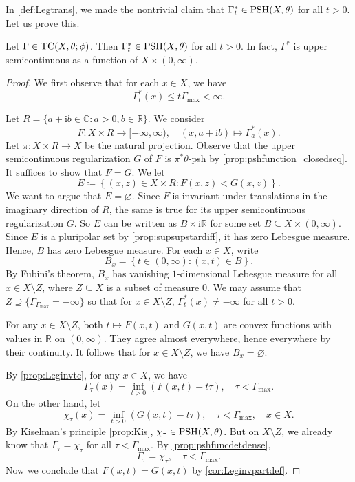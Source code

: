 In \cref{def:Legtrans}, we made the nontrivial claim that $\Gamma^*_t\in \mathrm{PSH}(X,\theta)$ for all $t>0$. Let us prove this.
\begin{lemma}\label{lma:testcurvelegusc}
    Let $\Gamma\in \mathrm{TC}(X,\theta;\phi)$. Then $\Gamma^*_t\in \mathrm{PSH}(X,\theta)$ for all $t>0$. In fact, $\Gamma^*$ is upper semicontinuous as a function of $X\times (0,\infty)$.
\end{lemma}
\begin{proof}
    We first observe that for each $x\in X$, we have
    \[
        \Gamma_t^*(x)\leq t\Gamma_{\max}<\infty.
    \]

    Let $R=\{a+\mathrm{i}b\in \mathbb{C}:a>0,b\in \mathbb{R}\}$. We consider
    \[
        F\colon X\times R\rightarrow [-\infty,\infty),\quad (x,a+\mathrm{i}b)\mapsto \Gamma_a^*(x).
    \]
    Let $\pi\colon X\times R\rightarrow X$ be the natural projection.
    Observe that the upper semicontinuous regularization $G$ of $F$ is $\pi^*\theta$-psh by \cref{prop:pshfunction_closedseq}.
    It suffices to show that $F=G$.
    We let
    \[
        E\coloneqq \left\{ (x,z)\in X\times R: F(x,z)<G(x,z)  \right\}.
    \]
    We want to argue that $E=\varnothing$. Since $F$ is invariant under translations in the imaginary direction of $R$, the same is true for its upper semicontinuous regularization $G$. So $E$ can be written as $B\times \mathrm{i}\mathbb{R}$ for some set $B\subseteq X\times (0,\infty)$. Since $E$ is a pluripolar set by \cref{prop:supsupstardiff}, it has zero Lebesgue measure. Hence, $B$ has zero Lebesgue measure. For each $x\in X$, write
    \[
        B_x=\left\{t\in (0,\infty): (x,t)\in B \right\}.
    \]
    By Fubini's theorem, $B_x$ has vanishing $1$-dimensional Lebesgue measure for all $x\in X\setminus Z$, where $Z\subseteq X$ is a subset of measure $0$. We may assume that $Z\supseteq \{\Gamma_{\Gamma_{\max}}=-\infty\}$ so that for $x\in X\setminus Z$, $\Gamma^*_t(x)\neq -\infty$ for all $t>0$.

    For any $x\in X\setminus Z$, both $t\mapsto F(x,t)$ and $G(x,t)$ are convex functions with values in $\mathbb{R}$ on $(0,\infty)$. They agree almost everywhere, hence everywhere by their continuity. It follows that for $x\in X\setminus Z$, we have $B_x=\varnothing$.

    By \cref{prop:Leginvtc}, for any $x\in X$, we have
    \[
        \Gamma_{\tau}(x)=\inf_{t>0} (F(x,t)-t\tau),\quad \tau<\Gamma_{\max}.
    \]
    On the other hand, let
    \begin{equation}\label{eq:chiGlegtemp1}
        \chi_{\tau}(x)=\inf_{t>0} (G(x,t)-t\tau),\quad \tau<  \Gamma_{\max},\quad x\in X.
    \end{equation}
    By Kiselman's principle \cref{prop:Kis}, $\chi_{\tau}\in \mathrm{PSH}(X,\theta)$. But on $X\setminus Z$, we already know that $\Gamma_{\tau}=\chi_{\tau}$ for all $\tau<\Gamma_{\max}$. By \cref{prop:pshfuncdetdense},
    \[
    \Gamma_{\tau}=\chi_{\tau},\quad \tau<\Gamma_{\max}.
    \]
    Now we conclude that $F(x,t)=G(x,t)$ by \cref{cor:Leginvpartdef}.
\end{proof}

